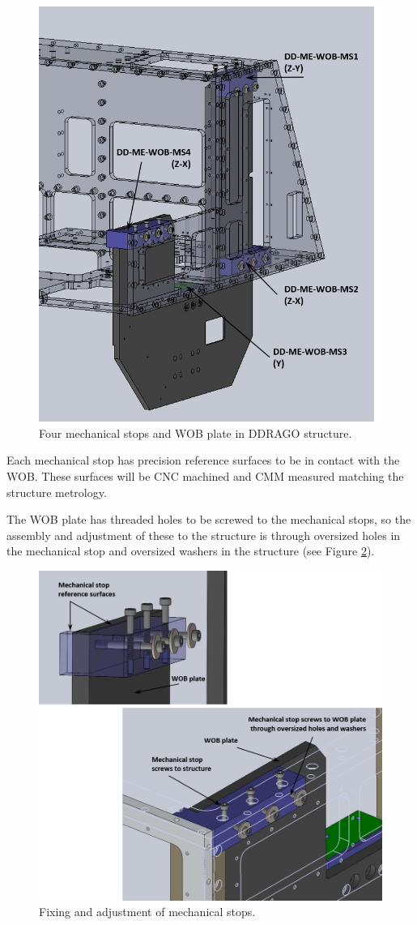 \documentclass{report}
\begin{document}
\begin{figure}
\begin{center}
\includegraphics[width=0.7\linewidth]{figures/Mechanical-stops-struct.png}
\end{center}
\caption{Four mechanical stops and WOB plate in DDRAGO structure.}
\label{figure:MS-WOB}
\end{figure}


Each mechanical stop has precision reference surfaces to be in contact with the WOB. These surfaces will be CNC machined and CMM measured matching the structure metrology.

The WOB plate has threaded holes to be screwed to the mechanical stops, so the assembly and adjustment of these to the structure is through oversized holes in the mechanical stop and oversized washers in the structure (see Figure \ref{figure:MS-DET}).

\begin{figure}
\begin{center}
\includegraphics[width=0.7\linewidth]{figures/Mechanical-stops-detail.png}
\end{center}
\caption{Fixing and adjustment of mechanical stops.}
\label{figure:MS-DET}
\end{figure}
\end{document}
